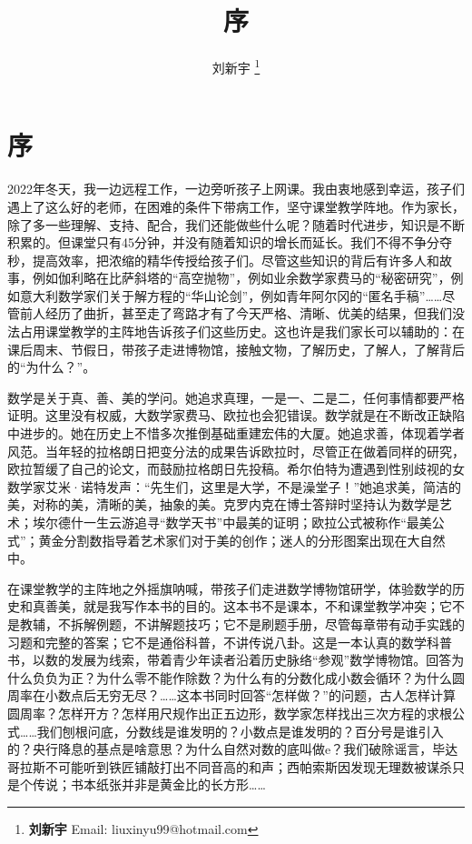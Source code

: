 \documentclass[b5paper]{ctexart}
\begin{document}
\title{序}

\author{刘新宇
\thanks{{\bfseries 刘新宇} \newline
  Email: liuxinyu99@hotmail.com \newline}
  }

\maketitle
\fi


\chapter*{序}

2022年冬天，我一边远程工作，一边旁听孩子上网课。我由衷地感到幸运，孩子们遇上了这么好的老师，在困难的条件下带病工作，坚守课堂教学阵地。作为家长，除了多一些理解、支持、配合，我们还能做些什么呢？随着时代进步，知识是不断积累的。但课堂只有45分钟，并没有随着知识的增长而延长。我们不得不争分夺秒，提高效率，把浓缩的精华传授给孩子们。尽管这些知识的背后有许多人和故事，例如伽利略在比萨斜塔的“高空抛物”，例如业余数学家费马的“秘密研究”，例如意大利数学家们关于解方程的“华山论剑”，例如青年阿尔冈的“匿名手稿”……尽管前人经历了曲折，甚至走了弯路才有了今天严格、清晰、优美的结果，但我们没法占用课堂教学的主阵地告诉孩子们这些历史。这也许是我们家长可以辅助的：在课后周末、节假日，带孩子走进博物馆，接触文物，了解历史，了解人，了解背后的“为什么？”。

数学是关于真、善、美的学问。她追求真理，一是一、二是二，任何事情都要严格证明。这里没有权威，大数学家费马、欧拉也会犯错误。数学就是在不断改正缺陷中进步的。她在历史上不惜多次推倒基础重建宏伟的大厦。她追求善，体现着学者风范。当年轻的拉格朗日把变分法的成果告诉欧拉时，尽管正在做着同样的研究，欧拉暂缓了自己的论文，而鼓励拉格朗日先投稿。希尔伯特为遭遇到性别歧视的女数学家艾米·诺特发声：“先生们，这里是大学，不是澡堂子！”她追求美，简洁的美，对称的美，清晰的美，抽象的美。克罗内克在博士答辩时坚持认为数学是艺术；埃尔德什一生云游追寻“数学天书”中最美的证明；欧拉公式被称作“最美公式”；黄金分割数指导着艺术家们对于美的创作；迷人的分形图案出现在大自然中。

在课堂教学的主阵地之外摇旗呐喊，带孩子们走进数学博物馆研学，体验数学的历史和真善美，就是我写作本书的目的。这本书不是课本，不和课堂教学冲突；它不是教辅，不拆解例题，不讲解题技巧；它不是刷题手册，尽管每章带有动手实践的习题和完整的答案；它不是通俗科普，不讲传说八卦。这是一本认真的数学科普书，以数的发展为线索，带着青少年读者沿着历史脉络“参观”数学博物馆。回答为什么负负为正？为什么零不能作除数？为什么有的分数化成小数会循环？为什么圆周率在小数点后无穷无尽？……这本书同时回答“怎样做？”的问题，古人怎样计算圆周率？怎样开方？怎样用尺规作出正五边形，数学家怎样找出三次方程的求根公式……我们刨根问底，分数线是谁发明的？小数点是谁发明的？百分号是谁引入的？央行降息的基点是啥意思？为什么自然对数的底叫做e？我们破除谣言，毕达哥拉斯不可能听到铁匠铺敲打出不同音高的和声；西帕索斯因发现无理数被谋杀只是个传说；书本纸张并非是黄金比的长方形……
\end{document}
